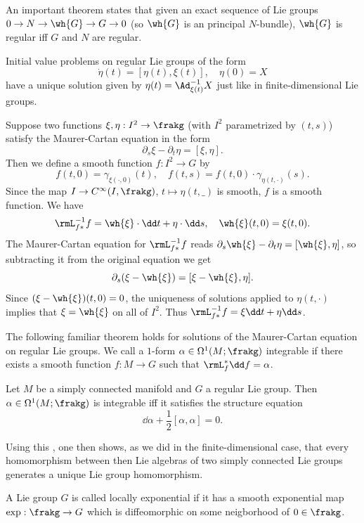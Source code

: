 An important theorem states that given an exact sequence of Lie groups $0\to N\to \wh{G}\to G\to 0$ (so $\wh{G}$ is an principal $N$-bundle), $\wh{G}$ is regular iff $G$ and $N$ are regular.

Initial value problems on regular Lie groups of the form
\[\dot\eta(t)=[\eta(t),\xi(t)],\quad \eta(0)=X\]
have a unique solution given by $\eta(t)=\Ad_{\xi(t)}^{-1
}X$ just like in finite-dimensional Lie groups.


\begin{rem}
    Suppose two functions $\xi,\eta:I^2\to \frakg$ (with $I^2$ parametrized by $(t,s)$) satisfy the Maurer-Cartan equation in the form
    \[\partial_s \xi-\partial_t \eta=[\xi,\eta].\]
    Then we define a smooth function $f:I^2\to G$ by
    \[f(t,0)=\gamma_{\xi(\cdot,0)}(t),\quad f(t,s)=f(t,0)\cdot \gamma_{\eta(t,\cdot)}(s).\]
    Since the map $I\to C^\infty(I,\frakg)$, $t\mapsto \eta(t,\_)$ is smooth, $f$ is a smooth function. We have
    \[\rmL_{f\ast}^{-1}f=\wh{\xi}\cdot \dd t+\eta\cdot \dd s,\quad \wh{\xi}(t,0)=\xi(t,0).\]
    The Maurer-Cartan equation for $\rmL_{f\ast}^{-1}f$ reads $\partial_s \wh{\xi}-\partial_t\eta=[\wh{\xi},\eta]$, so subtracting it from the original equation we get
    \[\partial_s(\xi-\wh{\xi})=[\xi-\wh{\xi},\eta].\]
    Since $(\xi-\wh{\xi})(t,0)=0$, the uniqueness of solutions applied to $\eta(t,\cdot)$ implies that $\xi=\wh{\xi}$ on all of $I^2$. Thus $\rmL_{f\ast}^{-1}f=\xi\dd t+\eta\dd s$.
\end{rem}

The following familiar theorem holds for solutions of the Maurer-Cartan equation on regular Lie groups. We call a $1$-form $\alpha\in\Omega^1(M;\frakg)$ integrable if there exists a smooth function $f:M\to G$ such that $\rmL_f^\ast \dd f=\alpha$.

\begin{thm}
    Let $M$ be a simply connected manifold and $G$ a regular Lie group. Then $\alpha\in\Omega^1(M;\frakg)$ is integrable iff it satisfies the structure equation
    \[\dd\alpha +\frac12[\alpha,\alpha]=0.\]
\end{thm}

Using this , one then shows, as we did in the finite-dimensional case, that every homomorphism between then Lie algebras of two simply connected Lie groups generates a unique Lie group homomorphism.

\begin{defn}
    A Lie group $G$ is called locally exponential if it has a smooth exponential map $\exp:\frakg\to G$ which is diffeomorphic on some neigborhood of $0\in\frakg$.
\end{defn}

